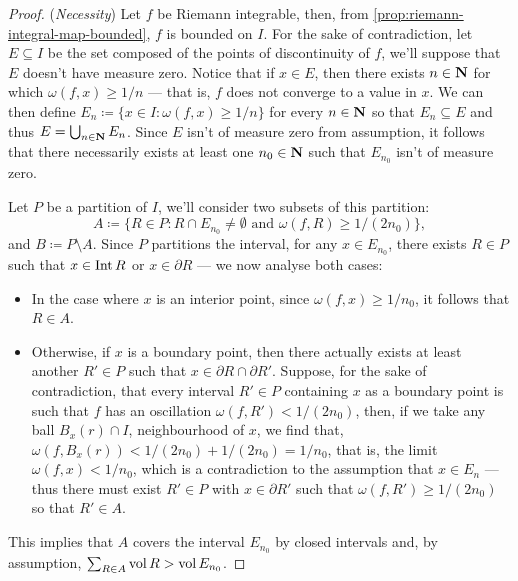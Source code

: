 \begin{proof}
(\emph{Necessity}) Let \(f\) be Riemann integrable, then, from
\cref{prop:riemann-integral-map-bounded}, \(f\) is bounded on \(I\). For the
sake of contradiction, let \(E \subseteq I\) be the set composed of the points
of discontinuity of \(f\), we'll suppose that \(E\) doesn't have measure
zero. Notice that if \(x \in E\), then there exists \(n \in \mathbf{N}\) for which
\(\omega(f, x) \geq 1/n\) --- that is, \(f\) does not converge to a value in
\(x\). We can then define \(E_n \coloneq \{x \in I : \omega(f, x) \geq 1/n\}\)
for every \(n \in \mathbf{N}\) so that \(E_n \subseteq E\) and thus \(E = \bigcup_{n \in
\mathbf{N}} E_n\). Since \(E\) isn't of measure zero from assumption, it follows that
there necessarily exists at least one \(n_0 \in \mathbf{N}\) such that \(E_{n_0}\) isn't
of measure zero.

Let \(P\) be a partition of \(I\), we'll consider two subsets of this partition:
\[
  A \coloneq \{R \in P : R \cap E_{n_{0}} \neq \emptyset
  \text{ and } \omega(f, R) \geq 1/(2n_0)\},
\]
and \(B \coloneq P \setminus A\). Since \(P\) partitions the interval, for any
\(x \in E_{n_0}\), there exists \(R \in P\) such that \(x \in \operatorname{Int} R\) or \(x
\in \partial R\) --- we now analyse both cases:
\begin{itemize}\setlength\itemsep{0em}
\item In the case where \(x\) is an interior point, since \(\omega(f, x) \geq
  1/n_0\), it follows that \(R \in A\).
\item Otherwise, if \(x\) is a boundary point, then there actually exists at
  least another \(R' \in P\) such that \(x \in \partial R \cap \partial
  R'\). Suppose, for the sake of contradiction, that every interval \(R' \in P\)
  containing \(x\) as a boundary point is such that \(f\) has an oscillation
  \(\omega(f, R') < 1/(2n_0)\), then, if we take any ball \(B_x(r) \cap I\),
  neighbourhood of \(x\), we find that, \(\omega(f, B_x(r)) < 1/(2n_0) +
  1/(2n_0) = 1/n_0\), that is, the limit \(\omega(f, x) < 1/n_0\), which is a
  contradiction to the assumption that \(x \in E_n\) --- thus there must exist
  \(R' \in P\) with \(x \in \partial R'\) such that \(\omega(f, R') \geq
  1/(2n_0)\) so that \(R' \in A\).
\end{itemize}
This implies that \(A\) covers the interval \(E_{n_0}\) by closed intervals and,
by assumption, \(\sum_{R \in A} \operatorname{vol} R > \operatorname{vol} E_{n_0}\).


\end{proof}
